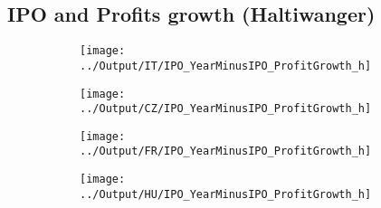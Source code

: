 \documentclass[12pt,notitlepage]{article}
\begin{document}
\subsection*{IPO and Profits growth (Haltiwanger)}
\begin{figure}[!htpb]
\centering
\caption{IPO and Number of Employees- Decomposition}
\begin{subfigure}{.49\textwidth}
    \centering
 \texttt{[image: ../Output/IT/IPO\_YearMinusIPO\_ProfitGrowth\_h]}
\end{subfigure}%
\begin{subfigure}{.49\textwidth}
    \centering
 \texttt{[image: ../Output/CZ/IPO\_YearMinusIPO\_ProfitGrowth\_h]}
\end{subfigure}
\begin{subfigure}{.49\textwidth}
    \centering
 \texttt{[image: ../Output/FR/IPO\_YearMinusIPO\_ProfitGrowth\_h]}
\end{subfigure}%
\begin{subfigure}{.49\textwidth}
    \centering
 \texttt{[image: ../Output/HU/IPO\_YearMinusIPO\_ProfitGrowth\_h]}
\end{subfigure}
\end{figure}
\pagebreak
\end{document}
